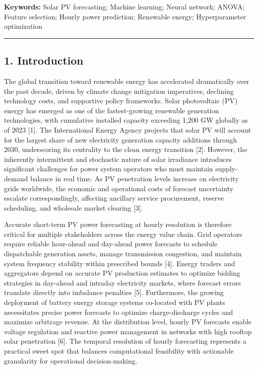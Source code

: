 \documentclass[
  11pt,
]{article}
\begin{document}
\textbf{Keywords:} Solar PV forecasting; Machine learning; Neural
network; ANOVA; Feature selection; Hourly power prediction; Renewable
energy; Hyperparameter optimization

\begin{center}\rule{0.5\linewidth}{0.5pt}\end{center}

\subsection{1. Introduction}\label{introduction}

The global transition toward renewable energy has accelerated
dramatically over the past decade, driven by climate change mitigation
imperatives, declining technology costs, and supportive policy
frameworks. Solar photovoltaic (PV) energy has emerged as one of the
fastest-growing renewable generation technologies, with cumulative
installed capacity exceeding 1,200 GW globally as of 2023 {[}1{]}. The
International Energy Agency projects that solar PV will account for the
largest share of new electricity generation capacity additions through
2030, underscoring its centrality to the clean energy transition
{[}2{]}. However, the inherently intermittent and stochastic nature of
solar irradiance introduces significant challenges for power system
operators who must maintain supply-demand balance in real time. As PV
penetration levels increase on electricity grids worldwide, the economic
and operational costs of forecast uncertainty escalate correspondingly,
affecting ancillary service procurement, reserve scheduling, and
wholesale market clearing {[}3{]}.

Accurate short-term PV power forecasting at hourly resolution is
therefore critical for multiple stakeholders across the energy value
chain. Grid operators require reliable hour-ahead and day-ahead power
forecasts to schedule dispatchable generation assets, manage
transmission congestion, and maintain system frequency stability within
prescribed bounds {[}4{]}. Energy traders and aggregators depend on
accurate PV production estimates to optimize bidding strategies in
day-ahead and intraday electricity markets, where forecast errors
translate directly into imbalance penalties {[}5{]}. Furthermore, the
growing deployment of battery energy storage systems co-located with PV
plants necessitates precise power forecasts to optimize charge-discharge
cycles and maximize arbitrage revenue. At the distribution level, hourly
PV forecasts enable voltage regulation and reactive power management in
networks with high rooftop solar penetration {[}6{]}. The temporal
resolution of hourly forecasting represents a practical sweet spot that
balances computational feasibility with actionable granularity for
operational decision-making.
\end{document}
